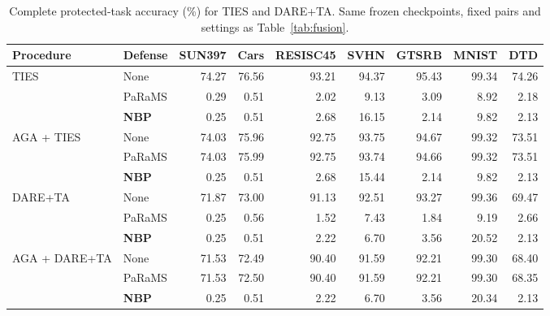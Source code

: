 \begin{table}[!t]
\centering
\small
\setlength{\tabcolsep}{4pt}
\caption{Complete protected-task accuracy (\%) for TIES and DARE+TA. Same frozen checkpoints, fixed pairs and settings as Table~\ref{tab:fusion}.}
\label{tab:fusion-tasks}
\begin{tabular}{llrrrrrrr}
\toprule
Procedure & Defense & SUN397 & Cars & RESISC45 & SVHN & GTSRB & MNIST & DTD \\
\midrule
\multirow{3}{*}{TIES} & None & 74.27 & 76.56 & 93.21 & 94.37 & 95.43 & 99.34 & 74.26 \\
 & PaRaMS & 0.29 & 0.51 & 2.02 & 9.13 & 3.09 & 8.92 & 2.18 \\
 & \textbf{NBP} & 0.25 & 0.51 & 2.68 & 16.15 & 2.14 & 9.82 & 2.13 \\
\midrule
\multirow{3}{*}{AGA + TIES} & None & 74.03 & 75.96 & 92.75 & 93.75 & 94.67 & 99.32 & 73.51 \\
 & PaRaMS & 74.03 & 75.99 & 92.75 & 93.74 & 94.66 & 99.32 & 73.51 \\
 & \textbf{NBP} & 0.25 & 0.51 & 2.68 & 15.44 & 2.14 & 9.82 & 2.13 \\
\midrule
\multirow{3}{*}{DARE+TA} & None & 71.87 & 73.00 & 91.13 & 92.51 & 93.27 & 99.36 & 69.47 \\
 & PaRaMS & 0.25 & 0.56 & 1.52 & 7.43 & 1.84 & 9.19 & 2.66 \\
 & \textbf{NBP} & 0.25 & 0.51 & 2.22 & 6.70 & 3.56 & 20.52 & 2.13 \\
\midrule
\multirow{3}{*}{AGA + DARE+TA} & None & 71.53 & 72.49 & 90.40 & 91.59 & 92.21 & 99.30 & 68.40 \\
 & PaRaMS & 71.53 & 72.50 & 90.40 & 91.59 & 92.21 & 99.30 & 68.35 \\
 & \textbf{NBP} & 0.25 & 0.51 & 2.22 & 6.70 & 3.56 & 20.34 & 2.13 \\
\bottomrule
\end{tabular}
\end{table}
